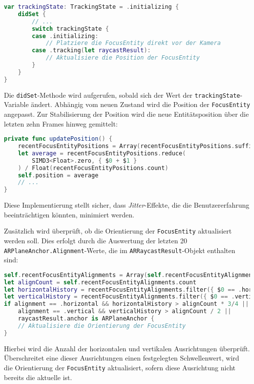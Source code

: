 \begin{lstlisting}[language=Swift]
var trackingState: TrackingState = .initializing {
    didSet {
        // ...
        switch trackingState {
        case .initializing:
            // Platziere die FocusEntity direkt vor der Kamera
        case .tracking(let raycastResult):
            // Aktualisiere die Position der FocusEntity
        }
    }
}
\end{lstlisting}

Die \texttt{didSet}-Methode wird aufgerufen, sobald sich der Wert der \texttt{trackingState}-Variable ändert. Abhängig vom neuen Zustand wird die Position der \texttt{FocusEntity} angepasst. Zur Stabilisierung der Position wird die neue Entitätsposition über die letzten zehn Frames hinweg gemittelt:

\begin{lstlisting}[language=Swift]
private func updatePosition() {
    recentFocusEntityPositions = Array(recentFocusEntityPositions.suffix(10))
    let average = recentFocusEntityPositions.reduce(
        SIMD3<Float>.zero, { $0 + $1 }
    ) / Float(recentFocusEntityPositions.count)
    self.position = average
    // ...
}
\end{lstlisting}

Diese Implementierung stellt sicher, dass \emph{Jitter}-Effekte, die die Benutzererfahrung beeinträchtigen könnten, minimiert werden.

Zusätzlich wird überprüft, ob die Orientierung der \texttt{FocusEntity} aktualisiert werden soll. Dies erfolgt durch die Auswertung der letzten 20 \texttt{ARPlaneAnchor.Alignment}-Werte, die im \texttt{ARRaycastResult}-Objekt enthalten sind:

\begin{lstlisting}[language=Swift]
self.recentFocusEntityAlignments = Array(self.recentFocusEntityAlignments.suffix(20))
let alignCount = self.recentFocusEntityAlignments.count
let horizontalHistory = recentFocusEntityAlignments.filter({ $0 == .horizontal }).count
let verticalHistory = recentFocusEntityAlignments.filter({ $0 == .vertical }).count
if alignment == .horizontal && horizontalHistory > alignCount * 3/4 ||
    alignment == .vertical && verticalHistory > alignCount / 2 ||
    raycastResult.anchor is ARPlaneAnchor {
    // Aktualisiere die Orientierung der FocusEntity
}
\end{lstlisting}

Hierbei wird die Anzahl der horizontalen und vertikalen Ausrichtungen überprüft. Überschreitet eine dieser Ausrichtungen einen festgelegten Schwellenwert, wird die Orientierung der \texttt{FocusEntity} aktualisiert, sofern diese Ausrichtung nicht bereits die aktuelle ist.

